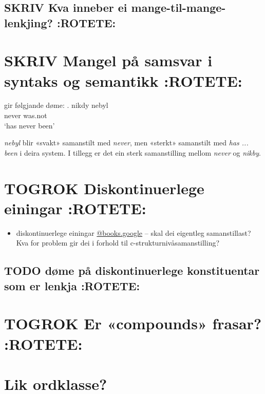 \documentclass[11pt,a4paper,oneside,draft]{book}
\begin{document}
\subsection{\textbf{SKRIV} Kva inneber ei mange-til-mange-lenkjing? \textbf{:ROTETE:}}
\label{sec-3.10.1}


\section{\textbf{SKRIV} Mangel på samsvar i syntaks og semantikk \textbf{:ROTETE:}}
\label{sec-3.11}

\cite[s.~5]{kruijffkorbayova2006agc} gir følgjande døme: 
\ex.  nikdy nebyl \\
      never was.not\\
      `has never been'

\emph{nebyl} blir «svakt» samanstilt med \emph{never}, men «sterkt» samanstilt med
\emph{has ... been} i deira system. I tillegg er det ein sterk samanstilling
mellom \emph{never} og \emph{nikby}.


\section{\textbf{TOGROK} Diskontinuerlege einingar \textbf{:ROTETE:}}
\label{sec-3.12}

\begin{itemize}
\item diskontinuerlege einingar \cite[s.~4]{cheung2002scg}
     \href{http://scholar.google.no/scholar.bib%3Fhl%3Dno&lr%3D&ie%3DUTF-8&q%3Dinfo:Qh_MRSftNZgJ:scholar.google.com/&output%3Dcitation&oe%3DMACINTOSH&oi%3Dcitation}{@books.google} -- skal dei eigentleg samanstillast? Kva for problem
     gir dei i forhold til c-strukturnivåsamanstilling?
\end{itemize}
\subsection{\textbf{TODO} døme på diskontinuerlege konstituentar som er lenkja \textbf{:ROTETE:}}
\label{sec-3.12.1}

\section{\textbf{TOGROK} Er «compounds» frasar? \textbf{:ROTETE:}}
\label{sec-3.13}

 \citep[p.~1]{giegerich2006aea}


\section{Lik ordklasse?}
\label{sec-3.14}
\end{document}
